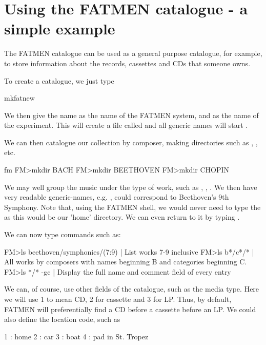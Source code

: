 \section{Using the FATMEN catalogue - a simple example}
\par
The FATMEN catalogue can be used as a general purpose
catalogue, for example, to store information about
the records, cassettes and CDs that someone owns.
\par
To create a catalogue, we just type
\begin{XMP}
mkfatnew
\end{XMP}
We then give the name  as the name of 
the FATMEN system, and  as the
name of the experiment. This will create a file
called  and all generic names will
start .
\par
We can then catalogue our collection by composer,
making directories such as , , 
 etc.
\begin{XMP}
fm
FM>mkdir BACH
FM>mkdir BEETHOVEN
FM>mkdir CHOPIN
\end{XMP}
\par
We may well group the music under the type of work, such
as , , .
We then have very readable generic-names,
e.g. ,
could correspond to Beethoven's 9th Symphony.
Note that, using the FATMEN shell, 
we would never need to type the 
as this would be our 'home' directory. We can even
return to it by typing .
\par
We can now type commands such as:
\begin{XMP}
FM>ls beethoven/symphonies/(7:9) | List works 7-9 inclusive
FM>ls b*/c*/*                   | All works by composers
                                  with names beginning B
                                  and categories beginning C.
FM>ls */* -gc | Display the full name and comment field of 
                every entry
\end{XMP}
\par
We can, of course, use other fields of the catalogue, such
as the media type. Here we will use 1 to mean CD, 2 for 
cassette and 3 for LP. Thus, by default, FATMEN will preferentially
find a CD before a cassette before an LP. 
We could also define the location code, such as
\begin{XMP}
1 : home
2 : car
3 : boat
4 : pad in St. Tropez
\end{XMP}
